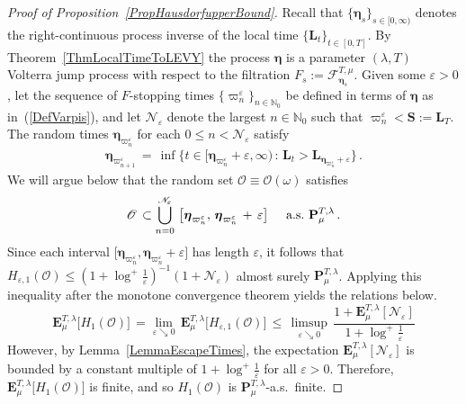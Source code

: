 \documentclass[10pt]{article}
\numberwithin{equation}{section}
\theoremstyle{definition}
\begin{document}
\begin{proof}[Proof of Proposition~\ref{PropHausdorfupperBound}] Recall that $\{\boldsymbol{\eta}_s  \}_{s\in [0,\infty)}$ denotes the right-continuous process inverse of the local time  $\{\mathbf{L}_t\}_{t\in [0,T]}$.  By Theorem~\ref{ThmLocalTimeToLEVY} the process   $\boldsymbol{\eta} $ is a parameter $(\lambda,T) $ Volterra jump process with respect to the filtration $F_s:=\mathscr{F}_{\boldsymbol{\eta}_s}^{T,\mu} $.  Given some $\varepsilon>0$,  let the sequence of $F$-stopping times $\{\varpi_{n}^{\varepsilon}\}_{n\in\mathbb{N}_0}$ be defined in terms of $\boldsymbol{\eta} $  as in~(\ref{DefVarpis}), and let $\mathscr{N}_{\varepsilon}$ denote the largest $n\in \mathbb{N}_0$ such that $\varpi_{n}^{\varepsilon} <\mathbf{S}:= \mathbf{L}_T$.  The random times  $\boldsymbol{\eta}_{  \varpi_{n}^{\varepsilon}}$ for each $0\leq n < \mathscr{N}_{\varepsilon}$ satisfy
\begin{align*}
    \boldsymbol{\eta}_{  \varpi_{n+1}^{\varepsilon}}\,=\,\inf\Big\{ t\in \big[\boldsymbol{\eta}_{  \varpi_{n}^{\varepsilon}}+\varepsilon,\infty\big)  \,:\, \mathbf{L}_t> \mathbf{L}_{\boldsymbol{\eta}_{  \varpi_{n}^{\varepsilon} } +\varepsilon }\Big\}\,.
\end{align*}
  We will argue below that the random set $\mathscr{O}\equiv \mathscr{O}(\omega)$ satisfies
\begin{align}\label{OriginSetCovering}
\mathscr{O}\,\subset \bigcup_{n=0}^{ \mathscr{N}_{\varepsilon} } \,\big[ \boldsymbol{\eta}_{  \varpi_{n}^{\varepsilon}}, \,\boldsymbol{\eta}_{  \varpi_{n}^{\varepsilon} } \,+\,\varepsilon \big] \hspace{.5cm}\text{a.s.\,\,$\mathbf{P}_{\mu}^{T,\lambda}$\,.} 
\end{align}
 Since each interval $ \big[ \boldsymbol{\eta}_{  \varpi_{n}^{\varepsilon}}, \boldsymbol{\eta}_{  \varpi_{n}^{\varepsilon} } +\varepsilon \big]$ has length $ \varepsilon$, it follows that
$ H_{ \varepsilon,1}( \mathscr{O}) \leq   (1+\log^+  \frac{1}{\varepsilon}      )^{-1} (1+\mathscr{N}_{\varepsilon}) $   almost surely $\mathbf{P}_{\mu}^{T,\lambda}$.  Applying this inequality  after the monotone convergence theorem   yields the relations below.
$$   \mathbf{E}_{\mu }^{T,\lambda} \big[ H_{1}( \mathscr{O})\big]\,=\lim_{\varepsilon\searrow 0} \, \mathbf{E}_{\mu }^{T,\lambda} \big[ H_{ \varepsilon,1}( \mathscr{O}) \big] \,\leq \,\limsup_{ \varepsilon\searrow 0 }  \, \frac{1+\mathbf{E}_{\mu }^{T,\lambda} [\mathscr{N}_{\varepsilon} ]}{1+\log^+  \frac{1}{\varepsilon}       }  $$
However, by Lemma~\ref{LemmaEscapeTimes}, the expectation $\mathbf{E}_{\mu }^{T,\lambda} [\mathscr{N}_{\varepsilon} ]$ is bounded by a constant multiple of $ 1+\log^+  \frac{1}{\varepsilon} $ for all $\varepsilon>0$.  Therefore, $\mathbf{E}_{\mu }^{T,\lambda} \big[ H_{1}( \mathscr{O})\big]$ is finite, and so $ H_{1}( \mathscr{O})$ is $\mathbf{P}_{\mu }^{T,\lambda} $-a.s.\ finite.  \vspace{.1cm}


\end{proof}
\end{document}
